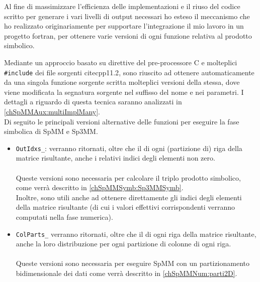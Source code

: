 Al fine di massimizzare l'efficienza delle implementazioni e il riuso del codice scritto per generare i vari livelli di output necessari
ho esteso il meccanismo che ho realizzato originariamente per supportare l'integrazione il mio lavoro in un progetto fortran, 
per ottenere varie versioni di ogni funzione relativa al prodotto simbolico.

Mediante un approccio basato su direttive del pre-processore C e molteplici \verb|#include| dei file sorgenti cite{cpp11.2},
sono riuscito ad ottenere automaticamente da una singola funzione sorgente scritta molteplici versioni della stessa,
dove viene modificata la segnatura sorgente nel suffisso del nome e nei parametri.
I dettagli a riguardo di questa tecnica saranno analizzati in \ref{chSpMMAux:multiImplMany}.\\
\label{chSpMMSymb:outputDetailLevel_coreFuncsVersions}
Di seguito le principali versioni alternative delle funzioni per eseguire la fase simbolica di SpMM e Sp3MM.\\
\begin{itemize}
	\item	\verb|OutIdxs_|:
	verranno ritornati, oltre che il \nnnz di ogni (partizione di) riga della matrice risultante,
	anche i relativi indici degli elementi non zero. %
	\\ \\
	Queste versioni sono necessaria per calcolare il triplo prodotto simbolico,
	come verrà descritto in \ref{chSpMMSymb:Sp3MMSymb}.\\
	Inoltre, sono utili anche ad ottenere direttamente gli indici 
	degli elementi \nnz della matrice risultante (di cui i valori effettivi corrispondenti verranno computati nella fase numerica).\\

	\item	\verb|ColParts_|
	verranno ritornati, oltre che il \nnnz di ogni riga della matrice risultante,
	anche la loro distribuzione per ogni partizione di colonne di ogni riga. %
	\\ \\ 
	Queste versioni sono necessaria per eseguire SpMM con un partizionamento bidimensionale dei dati
	come verrà descritto in \ref{chSpMMNum:parti2D}.\\

\end{itemize}


